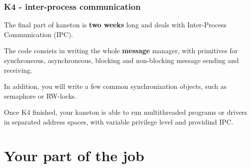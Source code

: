 \begin{frame}
  \frametitle{K4 - inter-process communication}

  The final part of kaneton is \textbf{two weeks} long and deals with
  Inter-Process Communication (IPC).

  \-

  The code consists in writing the whole \textbf{message} manager,
  with primitives for synchroneous, asynchroneous, blocking and
  non-blocking message sending and receiving.

  \-

  In addition, you will write a few common synchronization objects,
  such as semaphore or RW-locks.

  \-

  Once K4 finished, your kaneton is able to run multithreaded programs
  or drivers in separated address spaces, with variable privilege
  level and providind IPC.

\end{frame}







%
%

\section{Your part of the job}


